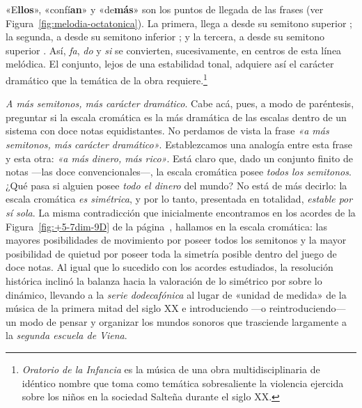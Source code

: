 \documentclass[a4paper,10pt]{article}
\begin{document}
\begin{multicols}{2}
«E\textbf{llos}», «confí\textbf{an}» y «de\textbf{más}» son los puntos de llegada de las frases (ver Figura~\ref{fig:melodia-octatonica}). La primera, llega a  desde su semitono superior \hbox{;} la segunda, a  desde su semitono inferior \hbox{;} y la tercera, a  desde su semitono superior \hbox{.} Así, \emph{fa}, \emph{do} y \emph{si} se convierten, sucesivamente, en centros de esta línea melódica. El conjunto, lejos de una estabilidad tonal, adquiere así el carácter dramático que la temática de la obra requiere.\footnote{\emph{Oratorio de la Infancia} es la música de una obra multidisciplinaria de idéntico nombre que toma como temática sobresaliente la violencia ejercida sobre los niños en la sociedad Salteña durante el siglo XX.}

\emph{A más semitonos, más carácter dramático}. Cabe acá, pues, a modo de paréntesis, preguntar si la escala cromática es la más dramática de las escalas dentro de un sistema con doce notas equidistantes. No perdamos de vista la frase \emph{«a más semitonos, más carácter dramático»}. Establezcamos una analogía entre esta frase y esta otra: \emph{«a más dinero, más rico»}. Está claro que, dado un conjunto finito de notas ---las doce convencionales---, la escala cromática posee \emph{todos los semitonos}. ¿Qué pasa si alguien posee \emph{todo el dinero} del mundo? No está de más decirlo: la escala cromática \emph{es simétrica}, y por lo tanto, presentada en totalidad, \emph{estable por sí sola}. La misma contradicción que inicialmente encontramos en los acordes de la Figura~\ref{fig:+5-7dim-9D} de la página~\pageref{fig:+5-7dim-9D}, hallamos en la escala cromática: las mayores posibilidades de movimiento por poseer todos los semitonos y la mayor posibilidad de quietud por poseer toda la simetría posible dentro del juego de doce notas. Al igual que lo sucedido con los acordes estudiados, la resolución histórica inclinó la balanza hacia la valoración de lo simétrico por sobre lo dinámico, llevando a la \emph{serie dodecafónica} al lugar de «unidad de medida» de la música de la primera mitad del siglo XX e introduciendo ---o reintroduciendo--- un modo de pensar y organizar los mundos sonoros que trasciende largamente a la \emph{segunda escuela de Viena}.
\end{multicols}
\end{document}
